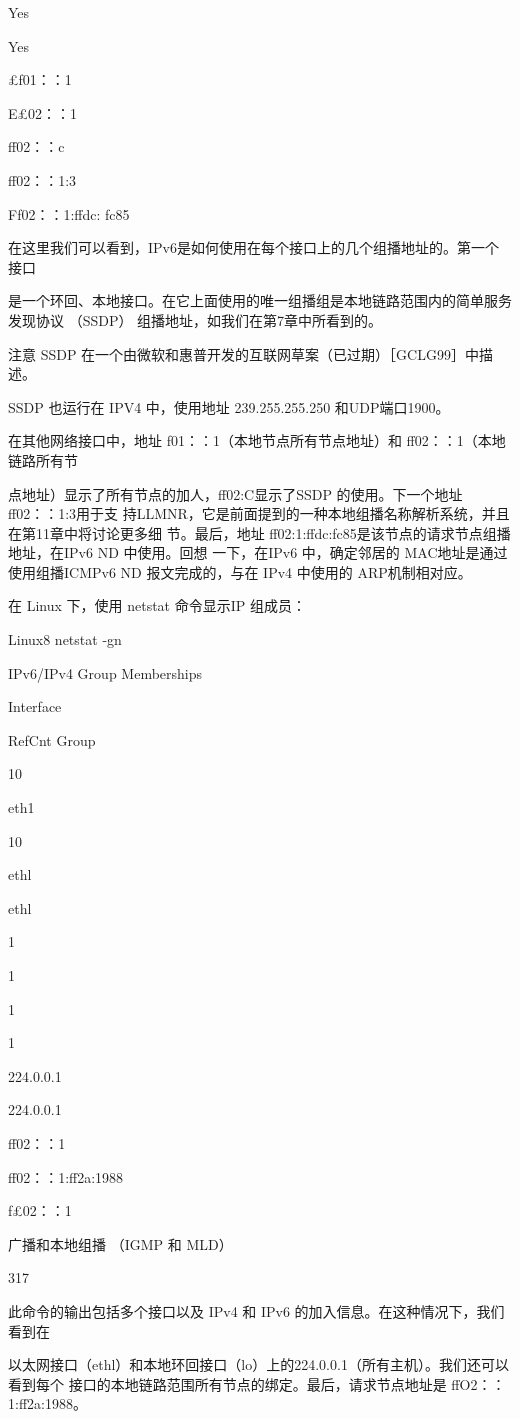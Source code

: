 Yes

Yes

£f01：：1

E£02：：1

ff02：：c

ff02：：1:3

Ff02：：1:ffdc: fc85

在这里我们可以看到，IPv6是如何使用在每个接口上的几个组播地址的。第一个接口

是一个环回、本地接口。在它上面使用的唯一组播组是本地链路范围内的简单服务发现协议
（SSDP） 组播地址，如我们在第7章中所看到的。

注意 SSDP 在一个由微软和惠普开发的互联网草案（已过期）［GCLG99］中描述。

SSDP 也运行在 IPV4 中，使用地址 239.255.255.250 和UDP端口1900。

在其他网络接口中，地址 f01：：1（本地节点所有节点地址）和 ff02：：1（本地链路所有节

点地址）显示了所有节点的加人，ff02:C显示了SSDP 的使用。下一个地址 ff02：：1:3用于支
持LLMNR，它是前面提到的一种本地组播名称解析系统，并且在第11章中将讨论更多细
节。最后，地址 ff02:1:ffdc:fc85是该节点的请求节点组播地址，在IPv6 ND 中使用。回想
一下，在IPv6 中，确定邻居的 MAC地址是通过使用组播ICMPv6 ND 报文完成的，与在
IPv4 中使用的 ARP机制相对应。

在 Linux 下，使用 netstat 命令显示IP 组成员：

Linux8 netstat -gn

IPv6/IPv4 Group Memberships

Interface

RefCnt Group

10

eth1

10

ethl

ethl

1

1

1

1

224.0.0.1

224.0.0.1

ff02：：1

ff02：：1:ff2a:1988

f£02：：1

广播和本地组播 （IGMP 和 MLD）

317

此命令的输出包括多个接口以及 IPv4 和 IPv6 的加入信息。在这种情况下，我们看到在

以太网接口（ethl）和本地环回接口（lo）上的224.0.0.1（所有主机）。我们还可以看到每个
接口的本地链路范围所有节点的绑定。最后，请求节点地址是 ffO2：：1:ff2a:1988。

